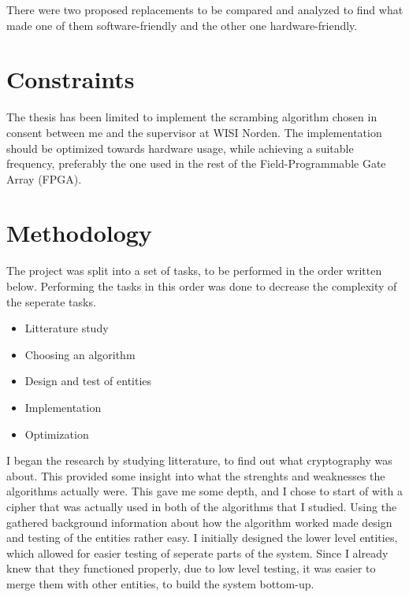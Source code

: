 There were two proposed replacements to be compared and analyzed 
to find what made one of them software-friendly and the other one 
hardware-friendly. 

\section{Constraints}
The thesis has been limited to implement the scrambing algorithm chosen 
in consent between me and the supervisor at WISI Norden. The 
implementation should be optimized towards hardware usage, while 
achieving a suitable frequency, preferably the one used in the rest of 
the Field-Programmable Gate Array (FPGA).


\section{Methodology}
The project was split into a set of tasks, to be performed in the order 
written below. Performing the tasks in this order was done to decrease 
the complexity of the seperate tasks.

\begin{itemize}
\item Litterature study
\item Choosing an algorithm
\item Design and test of entities
\item Implementation
\item Optimization
\end{itemize}

I began the research by studying litterature, to find out what 
cryptography was about. This provided some insight into what the 
strenghts and weaknesses the algorithms actually were. This gave me 
some depth, and I chose to start of with a cipher that was actually 
used in both of the algorithms that I studied. Using the gathered 
background information about how the algorithm worked made design 
and testing of the entities rather easy. I initially designed the lower
level entities, which allowed for easier testing of seperate parts of 
the system. Since I already knew that they functioned properly, due to 
low level testing, it was easier to merge them with other entities, to 
build the system bottom-up. 


